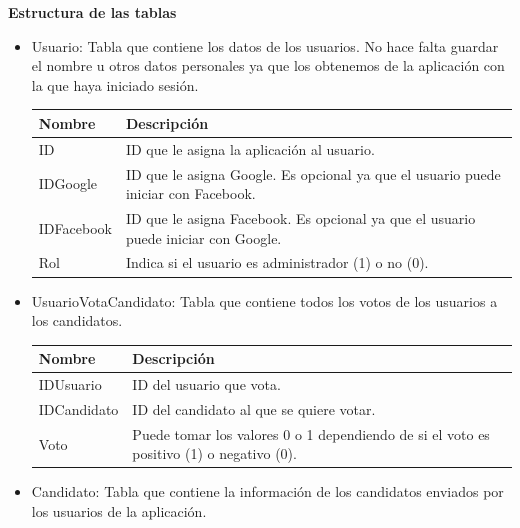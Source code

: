 \newpage

\textbf{Estructura de las tablas}

\begin{itemize}
\item Usuario: Tabla que contiene los datos de los usuarios. No hace falta guardar el nombre u otros datos personales ya que los obtenemos de la aplicación con la que haya iniciado sesión.


\begin{tabularx}{14cm}{|l|X|}
\hline
\textbf{Nombre} & \textbf{Descripción}                                                              \\ \hline
ID              & ID que le asigna la aplicación al usuario.                                         \\ \hline
IDGoogle        & ID que le asigna Google. Es opcional ya que el usuario puede iniciar con Facebook. \\ \hline
IDFacebook      & ID que le asigna Facebook. Es opcional ya que el usuario puede iniciar con Google. \\ \hline
Rol      & Indica si el usuario es administrador (1) o no (0). \\ \hline
\end{tabularx}
\vspace{1em}

\item UsuarioVotaCandidato: Tabla que contiene todos los votos de los usuarios a los candidatos.

\begin{tabularx}{14cm}{|l|X|}
\hline
\textbf{Nombre} & \textbf{Descripción}                                                              \\ \hline
IDUsuario       & ID del usuario que vota.                                                           \\ \hline
IDCandidato     & ID del candidato al que se quiere votar.                                           \\ \hline
Voto            & Puede tomar los valores 0 o 1 dependiendo de si el voto es positivo (1) o negativo (0). \\ \hline
\end{tabularx}
\vspace{1em}

\item Candidato: Tabla que contiene la información de los candidatos enviados por los usuarios de la aplicación.


\end{itemize}
